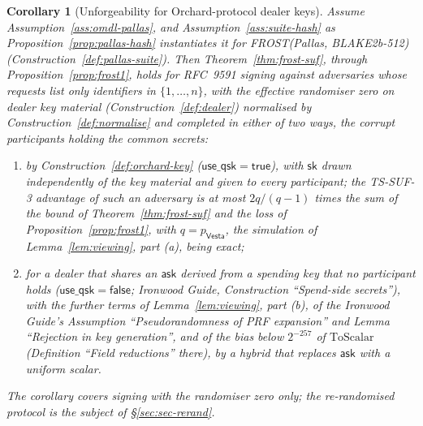 \documentclass[11pt,a4paper]{article}
\newtheorem{corollary}[theorem]{Corollary}
\theoremstyle{definition}
\newcommand{\Vesta}{\ensuremath{\mathsf{Vesta}}}
\newcommand{\ask}{\ensuremath{\mathsf{ask}}}
\begin{document}
\begin{corollary}[Unforgeability for Orchard-protocol dealer keys]
\label{cor:orchard-dealer}
Assume Assumption~\ref{ass:omdl-pallas}, and
Assumption~\ref{ass:suite-hash} as Proposition~\ref{prop:pallas-hash}
instantiates it for FROST(Pallas, BLAKE2b-512)
(Construction~\ref{def:pallas-suite}). Then Theorem~\ref{thm:frost-suf},
through Proposition~\ref{prop:frost1}, holds for RFC~9591 signing against
adversaries whose requests list only identifiers in \(\{1, \dots, n\}\), with
the effective randomiser zero on dealer key material
(Construction~\ref{def:dealer}) normalised by Construction~\ref{def:normalise}
and completed in either of two ways, the
corrupt participants holding the common secrets:
\begin{enumerate}
\item[(a)] by Construction~\ref{def:orchard-key}
  (\(\mathsf{use\_qsk} = \mathsf{true}\)), with \(\mathsf{sk}\) drawn
  independently of the key material and given to every participant; the TS-SUF-3
  advantage of such an adversary is at most \(2q/(q - 1)\) times the sum of the
  bound of Theorem~\ref{thm:frost-suf} and the loss of
  Proposition~\ref{prop:frost1}, with \(q = p_{\Vesta}\), the simulation of
  Lemma~\ref{lem:viewing}, part (a), being exact;
\item[(b)] for a dealer that shares an \(\ask\) derived from a spending key
  that no participant holds (\(\mathsf{use\_qsk} = \mathsf{false}\);
  \emph{Ironwood Guide}, Construction ``Spend-side secrets''), with the
  further terms of Lemma~\ref{lem:viewing}, part (b), of the \emph{Ironwood
  Guide}'s Assumption ``Pseudorandomness of PRF expansion'' and Lemma
  ``Rejection in key generation'', and of the bias below \(2^{-257}\) of
  \(\mathrm{ToScalar}\) (Definition ``Field reductions'' there), by a
  hybrid that replaces \(\ask\) with a uniform scalar.
\end{enumerate}
The corollary covers signing with the randomiser zero only; the
re-randomised protocol is the subject of \S\ref{sec:sec-rerand}.
\end{corollary}
\end{document}
